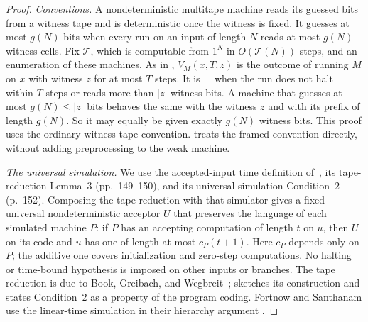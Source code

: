 \documentclass[11pt,letterpaper]{article}
\theoremstyle{definition}
\theoremstyle{remark}
\newcommand{\abs}[1]{\left|#1\right|}
\newcommand{\Tclk}{\mathcal T}
\begin{document}
\begin{proof}
\emph{Conventions.} A nondeterministic multitape machine reads its
guessed bits from a witness tape and is deterministic once the witness
is fixed. It guesses at most \(g(N)\) bits when every run on an input of
length \(N\) reads at most \(g(N)\) witness cells. Fix \(\Tclk\), which is
computable from \(1^N\) in \(O(\Tclk(N))\) steps, and an enumeration of
these machines. As in \cite[Section~4.1]{CLW20}, \(V_M(x,T,z)\) is the
outcome of running \(M\) on \(x\) with witness \(z\) for at most \(T\)
steps. It is \(\bot\) when the run does not halt within \(T\) steps or
reads more than \(\abs z\) witness bits. A machine that guesses at most
\(g(N)\le\abs z\) bits behaves the same with the witness \(z\) and with
its prefix of length \(g(N)\). So it may equally be given exactly
\(g(N)\) witness bits. This proof uses the ordinary witness-tape
convention.  treats the framed convention
directly, without adding preprocessing to the weak machine.

\emph{The universal simulation.} We use the accepted-input time
definition of~\cite[p.~147]{SFM78}, its tape-reduction Lemma~3
(pp.~149--150), and its universal-simulation Condition~2 (p.~152).
Composing the tape reduction with that simulator gives a fixed
universal nondeterministic acceptor \(U\) that preserves the language
of each simulated machine \(P\): if \(P\)
has an accepting computation of length \(t\) on \(u\), then \(U\)
on its code and \(u\) has one of length at most \(c_P(t+1)\).
Here \(c_P\) depends only on \(P\); the additive one covers
initialization and zero-step computations. No halting or time-bound
hypothesis is imposed on other inputs or branches. The tape reduction
is due to Book, Greibach, and Wegbreit~\cite{BGW70};
\cite{SFM78} sketches its construction and states Condition~2 as a
property of the program coding. Fortnow and Santhanam use the
linear-time simulation in their hierarchy argument
\cite[proof of Theorem~7.1]{FS16}.


\end{proof}
\end{document}
